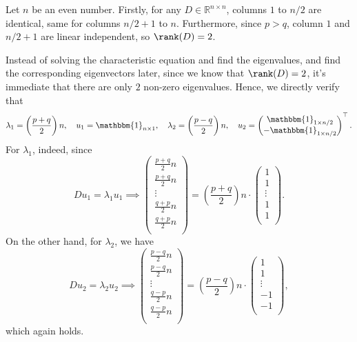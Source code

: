 \begin{answer}
	Let \(n\) be an even number. Firstly, for any \(D \in \mathbb{R} ^{n \times n}\), columns \(1\) to \(n / 2\) are identical, same for columns \(n / 2 + 1\) to \(n\). Furthermore, since \(p > q\), column \(1\) and \(n / 2 + 1\) are linear independent, so \(\rank (D) = 2\).

	Instead of solving the characteristic equation and find the eigenvalues, and find the corresponding eigenvectors later, since we know that \(\rank (D) = 2\), it's immediate that there are only \(2\) non-zero eigenvalues. Hence, we directly verify that
	\[
		\lambda _1 = \left( \frac{p + q}{2} \right) n, \quad
		u_1 = \mathbbm{1}_{n \times 1}, \quad
		\lambda _2 = \left( \frac{p-q}{2} \right) n, \quad
		u_2 = \begin{pmatrix}
			\mathbbm{1}_{1 \times n / 2}   \\
			- \mathbbm{1}_{1 \times n / 2} \\
		\end{pmatrix}^{\top}.
	\]
	For \(\lambda _1\), indeed, since
	\[
		D u_1
		= \lambda _1 u_1
		\implies \begin{pmatrix}
			\frac{p+q}{2}n \\
			\frac{p+q}{2}n \\
			\vdots         \\
			\frac{q+p}{2}n \\
			\frac{q+p}{2}n \\
		\end{pmatrix}
		= \left( \frac{p+q}{2} \right) n \cdot \begin{pmatrix}
			1      \\
			1      \\
			\vdots \\
			1      \\
			1      \\
		\end{pmatrix}.
	\]
	On the other hand, for \(\lambda _2\), we have
	\[
		D u_2
		= \lambda _2 u_2
		\implies \begin{pmatrix}
			\frac{p-q}{2}n \\
			\frac{p-q}{2}n \\
			\vdots         \\
			\frac{q-p}{2}n \\
			\frac{q-p}{2}n \\
		\end{pmatrix}
		= \left( \frac{p-q}{2} \right) n \cdot \begin{pmatrix}
			1      \\
			1      \\
			\vdots \\
			-1     \\
			-1     \\
		\end{pmatrix},
	\]
	which again holds.
\end{answer}

